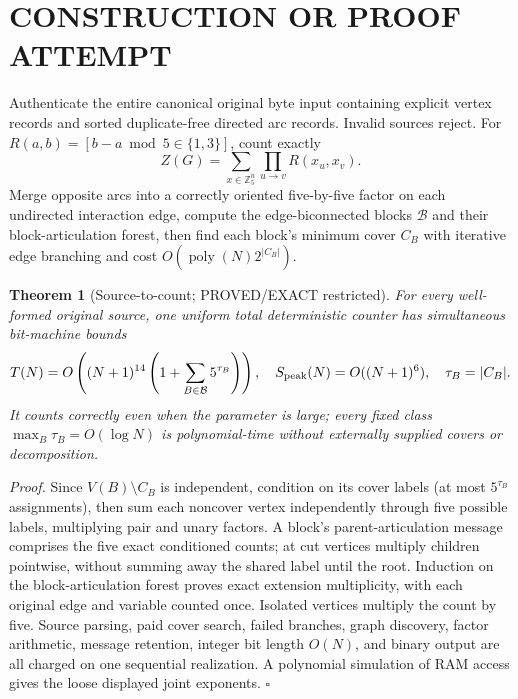 \documentclass[11pt]{article}
\newtheorem{theorem}{Theorem}
\begin{document}
\section{CONSTRUCTION OR PROOF ATTEMPT}
Authenticate the entire canonical original byte input containing explicit vertex records and sorted duplicate-free directed arc records. Invalid sources reject. For $R(a,b)=[b-a\bmod5\in\{1,3\}]$, count exactly
\[
Z(G)=\sum_{x\in\mathbb Z_5^n}\prod_{u\to v}R(x_u,x_v).
\]
Merge opposite arcs into a correctly oriented five-by-five factor on each undirected interaction edge, compute the edge-biconnected blocks $\mathcal B$ and their block-articulation forest, then find each block's minimum cover $C_B$ with iterative edge branching and cost $O(\operatorname{poly}(N)2^{|C_B|})$.

\begin{theorem}[Source-to-count; PROVED/EXACT restricted]
For every well-formed original source, one uniform total deterministic counter has simultaneous bit-machine bounds
\[
T(N)=O\left((N+1)^{14}\left(1+\sum_{B\in\mathcal B}5^{\tau_B}\right)\right),\quad
S_{\rm peak}(N)=O((N+1)^6),\quad \tau_B=|C_B|.
\]
It counts correctly even when the parameter is large; every fixed class $\max_B\tau_B=O(\log N)$ is polynomial-time without externally supplied covers or decomposition.
\end{theorem}
\noindent\emph{Proof.} Since $V(B)\setminus C_B$ is independent, condition on its cover labels (at most $5^{\tau_B}$ assignments), then sum each noncover vertex independently through five possible labels, multiplying pair and unary factors. A block's parent-articulation message comprises the five exact conditioned counts; at cut vertices multiply children pointwise, without summing away the shared label until the root. Induction on the block-articulation forest proves exact extension multiplicity, with each original edge and variable counted once. Isolated vertices multiply the count by five. Source parsing, paid cover search, failed branches, graph discovery, factor arithmetic, message retention, integer bit length $O(N)$, and binary output are all charged on one sequential realization. A polynomial simulation of RAM access gives the loose displayed joint exponents. $\square$
\end{document}
